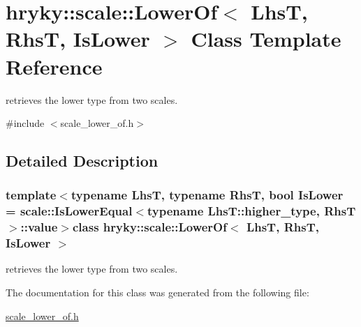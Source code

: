 \hypertarget{classhryky_1_1scale_1_1_lower_of}{\section{hryky\-:\-:scale\-:\-:Lower\-Of$<$ Lhs\-T, Rhs\-T, Is\-Lower $>$ Class Template Reference}
\label{classhryky_1_1scale_1_1_lower_of}
}


retrieves the lower type from two scales.  




{\ttfamily \#include $<$scale\-\_\-lower\-\_\-of.\-h$>$}



\subsection{Detailed Description}
\subsubsection*{template$<$typename Lhs\-T, typename Rhs\-T, bool Is\-Lower = scale\-::\-Is\-Lower\-Equal$<$typename Lhs\-T\-::higher\-\_\-type, Rhs\-T$>$\-::value$>$class hryky\-::scale\-::\-Lower\-Of$<$ Lhs\-T, Rhs\-T, Is\-Lower $>$}

retrieves the lower type from two scales. 

The documentation for this class was generated from the following file\-:\begin{DoxyCompactItemize}
\item 
\hyperlink{scale__lower__of_8h}{scale\-\_\-lower\-\_\-of.\-h}\end{DoxyCompactItemize}
